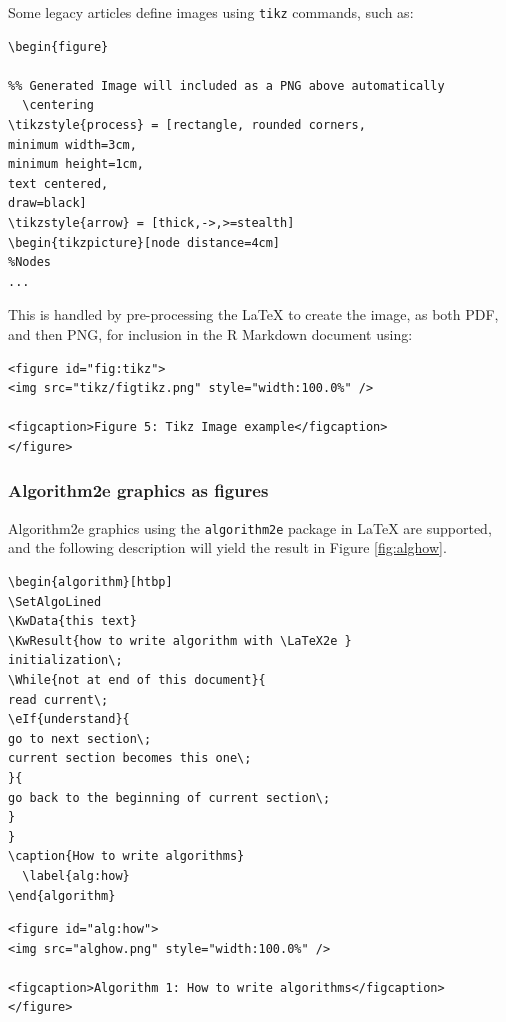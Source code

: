 Some legacy articles define images using \texttt{tikz} commands, such as:

\begin{verbatim}
\begin{figure}

%% Generated Image will included as a PNG above automatically
  \centering
\tikzstyle{process} = [rectangle, rounded corners,
minimum width=3cm, 
minimum height=1cm,
text centered, 
draw=black]
\tikzstyle{arrow} = [thick,->,>=stealth]
\begin{tikzpicture}[node distance=4cm]
%Nodes
...
\end{verbatim}

This is handled by pre-processing the LaTeX to create the image, as both PDF, and then PNG, for inclusion in the R Markdown document using:

\begin{verbatim}
<figure id="fig:tikz">
<img src="tikz/figtikz.png" style="width:100.0%" />

<figcaption>Figure 5: Tikz Image example</figcaption>
</figure>
\end{verbatim}

\hypertarget{algorithm2e-graphics-as-figures}{%
\subsubsection{Algorithm2e graphics as figures}\label{algorithm2e-graphics-as-figures}}

Algorithm2e graphics using the \texttt{algorithm2e} package in LaTeX are supported, and the following description will yield the result in Figure \ref{fig:alghow}.

\begin{verbatim}
\begin{algorithm}[htbp]
\SetAlgoLined
\KwData{this text}
\KwResult{how to write algorithm with \LaTeX2e }
initialization\;
\While{not at end of this document}{
read current\;
\eIf{understand}{
go to next section\;
current section becomes this one\;
}{
go back to the beginning of current section\;
}
}
\caption{How to write algorithms}
  \label{alg:how}
\end{algorithm}
\end{verbatim}

\begin{verbatim}
<figure id="alg:how">
<img src="alghow.png" style="width:100.0%" />

<figcaption>Algorithm 1: How to write algorithms</figcaption>
</figure>
\end{verbatim}

